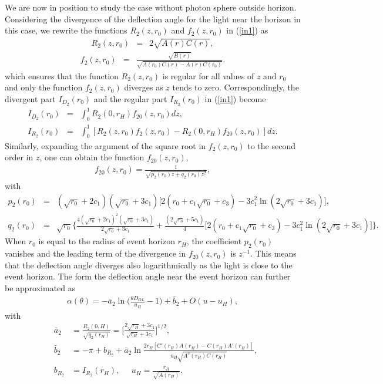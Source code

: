 \documentclass[aps,showpacs,preprintnumbers,amsmath,amssymb]{revtex4}
\begin{document}
We are now in position to study the case without photon sphere outside horizon. Considering the divergence of the deflection angle for the light near the horizon in this case, we rewrite the functions $R_2(z, r_0)$ and $f_2(z, r_0)$ in (\ref{in1}) as
\begin{eqnarray}
R_2(z,r_0)&=&2\sqrt{A(r)C(r)},
\end{eqnarray}
\begin{eqnarray}
f_2(z,r_0)&=&\frac{\sqrt{B(r)}}{\sqrt{A(r_0)C(r)-A(r)C(r_0)}}.
\end{eqnarray}
which ensures that the function $R_2(z, r_0)$ is regular for all values of $z$ and $r_0$ and only the function $f_2(z, r_0)$ diverges as $z$ tends to zero. Correspondingly,
the divergent part $I_{D_2}(r_0)$ and the regular
part $I_{R_2}(r_0)$ in (\ref{in1}) become
\begin{eqnarray}
I_{D_2}(r_0)&=&\int^{1}_{0}R_2(0,r_{H})f_{20}(z,r_0)dz, \nonumber\\
I_{R_2}(r_0)&=&\int^{1}_{0}[R_2(z,r_0)f_2(z,r_0)-R_2(0,r_{H})f_{20}(z,r_0)]dz
\label{intbr2}.
\end{eqnarray}
Similarly, expanding the argument of the square
root in $f_2(z,r_0)$ to the second order in $z$, one can obtain the
function $f_{20}(z,r_0)$,
\begin{eqnarray}
f_{20}(z,r_0)=\frac{1}{\sqrt{p_2(r_0)z+q_2(r_0)z^2}},
\end{eqnarray}
with
\begin{eqnarray}
p_2(r_0)&=& (\sqrt{r_0}+2c_1)(\sqrt{r_0}+3c_1)\bigg[
2(r_0+c_1\sqrt{r_0}+c_3)-3c^2_1\ln(2\sqrt{r_0}+3c_1)\bigg],  \nonumber\\
q_2(r_0)&=&\sqrt{r_0}\bigg\{\frac{4(\sqrt{r_0}+2c_1)^2(\sqrt{r_0}+3c_1)}{2\sqrt{r_0}+3c_1}
+\frac{(2\sqrt{r_0}+5c_1)}{4}\bigg[
2(r_0+c_1\sqrt{r_0}+c_3)-3c^2_1\ln(2\sqrt{r_0}+3c_1)\bigg]\bigg\}.
\end{eqnarray}
When $r_0$ is equal to the radius of event horizon $r_{H}$, the
coefficient $p_2(r_0)$ vanishes and the leading term of the
divergence in $f_{20}(z,r_0)$ is $z^{-1}$. This means that the deflection angle diverges also logarithmically as the light is close to the event horizon. The form the deflection angle near the event horizon can further be approximated as
\begin{eqnarray}
\alpha(\theta)=-\bar{a}_2\ln{\bigg(\frac{\theta
D_{OL}}{u_{H}}-1\bigg)}+\bar{b}_2+O(u-u_{H}),
\end{eqnarray}
with
\begin{eqnarray}
&\bar{a}_2&=\frac{R_2(0,H)}{\sqrt{q_2(r_{H})}}=
\bigg[\frac{2\sqrt{r_H}+3c_1}{\sqrt{r_H}+3c_1}\bigg]^{1/2}, \nonumber\\
&\bar{b}_2&=
-\pi+b_{R_2}+\bar{a}_2\ln{\frac{2r_H[C'(r_{H})A(r_{H})-C(r_{H})A'(r_{H})]}{
u_{H}\sqrt{A^3(r_{H})C(r_{H})}}}, \nonumber\\
&b_{R_2}&=I_{R_2}(r_{H}), \;\;\;\;\;u_{H}=\frac{r_{H}}{\sqrt{A(r_{H})}}.
\end{eqnarray}
\end{document}
